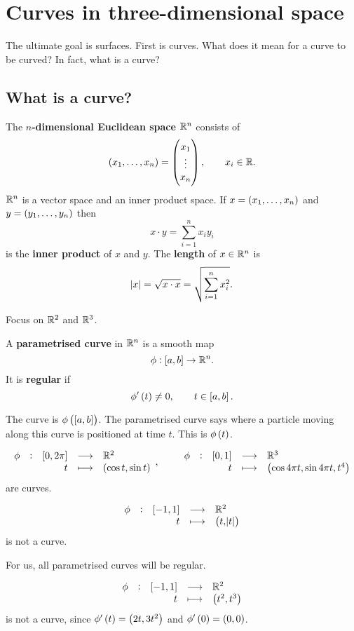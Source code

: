 \pagebreak

\section{Curves in three-dimensional space}

The ultimate goal is surfaces. First is curves. What does it mean for a curve to be curved? In fact, what is a curve?

\subsection{What is a curve?}

\begin{definition}
The \textbf{$ n $-dimensional Euclidean space} $ \mathbb{R}^n $ consists of
$$ \br{x_1, \dots, x_n} = \threebyone{x_1}{\vdots}{x_n}, \qquad x_i \in \RR. $$
$ \mathbb{R}^n $ is a vector space and an inner product space. If $ x = \br{x_1, \dots, x_n} $ and $ y = \br{y_1, \dots, y_n} $ then
$$ x \cdot y = \sum_{i = 1}^n x_iy_i $$
is the \textbf{inner product} of $ x $ and $ y $. The \textbf{length} of $ x \in \mathbb{R}^n $ is
$$ \abs{x} = \sqrt{x \cdot x} = \sqrt{\sum_{i = 1}^n x_i^2}. $$
\end{definition}

Focus on $ \mathbb{R}^2 $ and $ \mathbb{R}^3 $.

\begin{definition}
A \textbf{parametrised curve} in $ \mathbb{R}^n $ is a smooth map
$$ \phi : \sbr{a, b} \to \RR^n. $$
It is \textbf{regular} if
$$ \phi'\br{t} \ne 0, \qquad t \in \sbr{a, b}. $$
\end{definition}

The curve is $ \phi\br{\sbr{a, b}} $. The parametrised curve says where a particle moving along this curve is positioned at time $ t $. This is $ \phi\br{t} $.

\begin{example*}
$$ \function[\phi]{\sbr{0, 2\pi}}{\RR^2}{t}{\br{\cos t, \sin t}}, \qquad \function[\phi]{\sbr{0, 1}}{\RR^3}{t}{\br{\cos 4\pi t, \sin 4\pi t, t^4}} $$
are curves.
\end{example*}

\begin{example*}
$$ \function[\phi]{\sbr{-1, 1}}{\RR^2}{t}{\br{t, \abs{t}}} $$
is not a curve.
\end{example*}

For us, all parametrised curves will be regular.

\begin{example*}
$$ \function[\phi]{\sbr{-1, 1}}{\RR^2}{t}{\br{t^2, t^3}} $$
is not a curve, since $ \phi'\br{t} = \br{2t, 3t^2} $ and $ \phi'\br{0} = \br{0, 0} $.
\end{example*}

